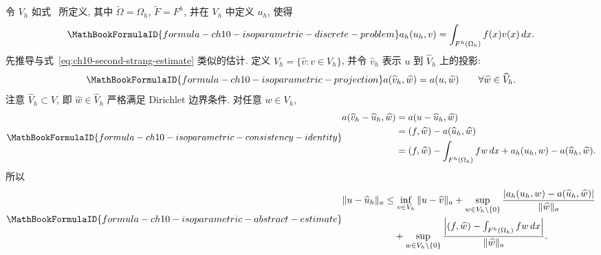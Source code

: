 令 $V_h$ 如式~ 所定义, 其中 $\widetilde\Omega=\Omega_h$, $\widetilde F=F^h$, 并在 $V_h$ 中定义 $u_h$, 使得
\begin{equation}
\MathBookFormulaID{formula-ch10-isoparametric-discrete-problem}
\label{eq:ch10-isoparametric-discrete-problem}
a_h(u_h,v)=\int_{F^h(\Omega_h)}f(x)v(x)\,dx.
\end{equation}
先推导与式~\eqref{eq:ch10-second-strang-estimate} 类似的估计. 定义 $\widehat V_h=\{\widehat v:v\in V_h\}$, 并令 $\widehat v_h$ 表示 $u$ 到 $\widehat V_h$ 上的投影:
\begin{equation}
\MathBookFormulaID{formula-ch10-isoparametric-projection}
\label{eq:ch10-isoparametric-projection}
a(\widehat v_h,\widehat w)=a(u,\widehat w)
\qquad\forall\widehat w\in\widehat V_h.
\end{equation}
注意 $\widehat V_h\subset V$, 即 $\widehat w\in\widehat V_h$ 严格满足 Dirichlet 边界条件. 对任意 $w\in V_h$,
\begin{equation}
\MathBookFormulaID{formula-ch10-isoparametric-consistency-identity}
\label{eq:ch10-isoparametric-consistency-identity}
\begin{split}
a(\widehat v_h-\widehat u_h,\widehat w)
&=a(u-\widehat u_h,\widehat w)\\
&=(f,\widehat w)-a(\widehat u_h,\widehat w)\\
&=(f,\widehat w)-\int_{F^h(\Omega_h)}fw\,dx
+a_h(u_h,w)-a(\widehat u_h,\widehat w).
\end{split}
\end{equation}
所以
\begin{equation}
\MathBookFormulaID{formula-ch10-isoparametric-abstract-estimate}
\label{eq:ch10-isoparametric-abstract-estimate}
\begin{split}
\|u-\widehat u_h\|_a
&\leq\inf_{v\in V_h}\|u-\widehat v\|_a
+\sup_{w\in V_h\setminus\{0\}}
\frac{|a_h(u_h,w)-a(\widehat u_h,\widehat w)|}{\|\widehat w\|_a}\\
&\quad+\sup_{w\in V_h\setminus\{0\}}
\frac{\left|(f,\widehat w)-\int_{F^h(\Omega_h)}fw\,dx\right|}{\|\widehat w\|_a}.
\end{split}
\end{equation}

